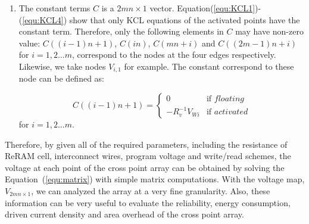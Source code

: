 \begin{enumerate}
  \item The constant terms $C$ is a $2mn{\times}1$ vector. Equation(\ref{equ:KCL1})-(\ref{equ:KCL4}) show that only KCL equations of the activated points have the constant term. Therefore, only the following elements in $C$ may have non-zero value: $C((i-1)n+1)$, $C(in)$, $C(mn+i)$ and $C((2m-1)n+i)$ for $i=1,2...m$, correspond to the nodes at the four edges respectively. Likewise, we take nodes $V_{i,1}$ for example. The constant correspond to these node can be defined as:

    \begin{equation}
    C((i-1)n+1) = \left\{
    \begin{array}{ll}
    0   & \text{if } floating\\
    -R_v^{-1}V_{Wi}& \text{if } activated
    \end{array} \right.
    \end{equation}
    for $i=1,2...m$.
\end{enumerate}

Therefore, by given all of the required parameters, including the resistance of ReRAM cell, interconnect wires, program voltage and write/read schemes, the voltage at each point of the cross point array can be obtained by solving the Equation~(\ref{equ:matrix}) with simple matrix computations. With the voltage map, $V_{2mn{\times}1}$, we can analyzed the array at a very fine granularity. Also, these information can be very useful to evaluate the reliability, energy consumption, driven current density and area overhead of the cross point array.
